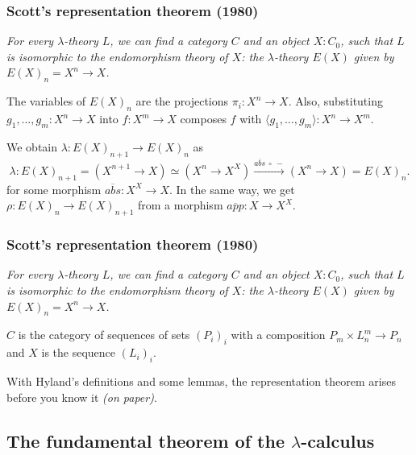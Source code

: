 \documentclass[aspectratio=169]{fancyslides} %
\begin{document}
  \begin{frame}
    \frametitle{Scott's representation theorem (1980)}

    \textit{For every $ \lambda $-theory $ L $, we can find a category $ C $ and an object $ X : C_0 $, such that $ L $ is isomorphic to the \textit{endomorphism theory} of $ X $: the $ \lambda $-theory $ E(X) $ given by $ E(X)_n = X^n \to X $.}

    \pause

    The variables of $ E(X)_n $ are the projections $ \pi_i: X^n \to X $. Also, substituting $ g_1, \dots, g_m : X^n \to X $ into $ f: X^m \to X $ composes $ f $ with $ \langle g_1, \dots, g_m \rangle : X^n \to X^m $.

    \pause

    We obtain $ \lambda: E(X)_{n + 1} \to E(X)_n $ as
    \[ \lambda: E(X)_{n + 1} = (X^{n + 1} \to X) \simeq (X^n \to X^X) \xrightarrow{\overline{abs}\ \circ\ -} (X^n \to X) = E(X)_n. \]
    for some morphism $ \overline{abs}: X^X \to X $. In the same way, we get $ \rho: E(X)_n \to E(X)_{n + 1} $ from a morphism $ \overline{app}: X \to X^X $.
  \end{frame}

  \begin{frame}
    \frametitle{Scott's representation theorem (1980)}

    \textit{For every $ \lambda $-theory $ L $, we can find a category $ C $ and an object $ X : C_0 $, such that $ L $ is isomorphic to the \textit{endomorphism theory} of $ X $: the $ \lambda $-theory $ E(X) $ given by $ E(X)_n = X^n \to X $.}

    $ C $ is the category of sequences of sets $ (P_i)_i $ with a composition $ P_m \times L_n^m \to P_n $ and $ X $ is the sequence $ (L_i)_i $.

    \pause

    With Hyland's definitions and some lemmas, the representation theorem arises before you know it \textit{(on paper)}.
  \end{frame}

  \subsection{The fundamental theorem of the \texorpdfstring{$\lambda$}{lambda}-calculus}
\end{document}
